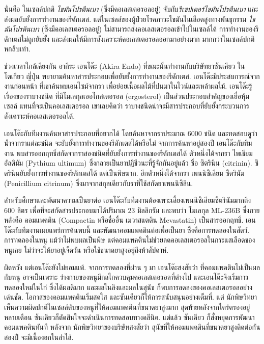 {\begin{shaded}
นั่นคือ
ในเซลล์ปกติ \textit{ไขมันโปรตีนเบา} (ซึ่งมีคอเลสเตอรอลอยู่) จับกับ\textit{รีเซปเตอร์ไขมันโปรตีนเบา} และส่งผลยับยั้งการทำงานของรีดักเตส.
แต่ในเซลล์ของผู้ป่วยโรคภาวะไขมันในเลือดสูงทางพันธุกรรม
\textit{ไขมันโปรตีนเบา} (ซึ่งมีคอเลสเตอรอลอยู่) 
ไม่สามารถส่งคอเลสเตอรอลเข้าไปในเซลล์ได้
การทำงานของรีดักเตสไม่ถูกยับยั้ง และส่งผลให้มีการสังเคราะห์คอเลสเตอรอลออกมาอย่างมาก มากกว่าในเซลล์ปกติหกสิบเท่า.

ช่วงเวลาใกล้เคียงกัน
อากีระ เอนโด๊ะ (Akira Endo) 
ที่ขณะนั้นทำงานกับบริษัทยาซันเคียว ในโตเกียว ญี่ปุ่น
พยายามค้นหาสารประกอบเพื่อยับยั้งการทำงานของรีดักเตส.
เอนโด๊ะมีประสบการณ์จากงานก่อนหน้า ที่เขาค้นพบเอนไซม์จากรา เพื่อย่อยเนื้อผลไม้ที่ปนมาในไวน์และเหล้าผลไม้.
เอนโด๊ะรู้เรื่องของราบางชนิด
ที่มีโมเลกุลเออโกสเตอรอล (ergosterol) เป็นส่วนประกอบสำคัญของเยื่อหุ้มเซลล์ แทนที่จะเป็นคอเลสเตอรอล
เขาเลยคิดว่า ราบางชนิดน่าจะมีสารประกอบที่ยับยั้งกระบวนการสังเคราะห์คอเลสเตอรอลได้.

เอนโด๊ะกับทีมงานค้นหาสารประกอบที่อยากได้ โดยค้นหาจากราประมาณ $6000$ ชนิด
และทดสอบดูว่า น้ำจากราแต่ละชนิด จะยับยั้งการทำงานของรีดักเตสได้หรือไม่
จากการค้นหาอยู่สองปี เอนโด๊ะกับทีมงาน พบสารออกฤทธิ์สกัดจากราสองชนิดที่ยับยั้งการทำงานของรีดักเตสได้
ตัวหนึ่งได้จากรา ไพเธียม อัลติมัม (Pythium ultimum) ซึ่งกลายเป็นยาปฏิชีวนะที่รู้จักกันอยู่แล้ว ชื่อ ซิตรินิน (citrinin).
ซิตรินินยับยั้งการทำงานของรีดักเตสได้ แต่เป็นพิษมาก.
อีกตัวหนึ่งได้จากรา เพนนิซิเลียม ซิตรินัม (Penicillium citrinum) ซึ่งมาจากสกุลเดียวกับราที่ใช้สกัดยาเพนนิซิลิน.

สำหรับศึกษาและพัฒนาความเป็นยาต่อ เอนโด๊ะกับทีมงานต้องเพาะเลี้ยงเพนนิซิเลียมซิตรินัมมากถึง $600$ ลิตร 
เพื่อที่จะสกัดสารประกอบมาได้ปริมาณ $23$ มิลลิกรัม
และพบว่า โมเลกุล ML-236B ซึ่งภายหลังคือ คอมแพคติน (Compactin หรือชื่ออื่น เมวาสแตติน Mevastatin) เป็นสารออกฤทธิ์.
เอนโด๊ะกับทีมงานเผยแพร่การค้นพบนี้\cite{Endo1976a} และพัฒนาคอมแพคตินต่อเพื่อเป็นยา ซึ่งคือการทดลองในสัตว์.
การทดลองในหนู แม้ว่าไม่พบผลเป็นพิษ แต่คอมแพคตินไม่ช่วยลดคอเลสเตอรอลในกระแสเลือดของหนูเลย ไม่ว่าจะให้ยาอยู่เจ็ดวัน หรือใช้ขนาดยาสูงอยู่ถึงห้าสัปดาห์.

ผิดหวัง แต่เอนโด๊ะยังไม่ยอมแพ้.
จากการทดลองที่ผ่าน ๆ มา 
เอนโด๊ะสงสัยว่า ที่คอมแพคตินไม่เป็นผลกับหนู อาจเป็นเพราะ ร่างกายของหนูมีกลไกควบคุมคอเลสเตอรอลที่ต่างไป
และเอนโด๊ะจึงเริ่มการทดลองใหม่ในไก่ ซึ่งได้ผลดีมาก และผลในลิงและผลในสุนัข ก็พบการลดลงของคอเลสเตอรอลอย่างเด่นชัด.
โอกาสของคอมแพคตินเริ่มสดใส และซันเคียวก็ให้การสนับสนุนอย่างเต็มที่.
แต่ นักพิษวิทยาเห็นความผิดปกติในเซลล์ตับของหนูที่ให้คอมแพคตินที่ขนาดยาสูงมาก
สุดท้ายหลังจากไตร่ตรองอยู่หลายเดือน ซันเคียวก็ตัดสินใจจะดำเนินการทดสอบทางคลีนิค.
แต่แล้ว
ซันเคียว ก็สั่งหยุดการพัฒนาคอมแพคตินทันที
หลังจาก นักพิษวิทยาของบริษัทสงสัยว่า สุนัขที่ให้คอมแพคตินที่ขนาดยาสูงติดต่อกันสองปี จะมีเนื้องอกในลำไส้.


\end{shaded}}
